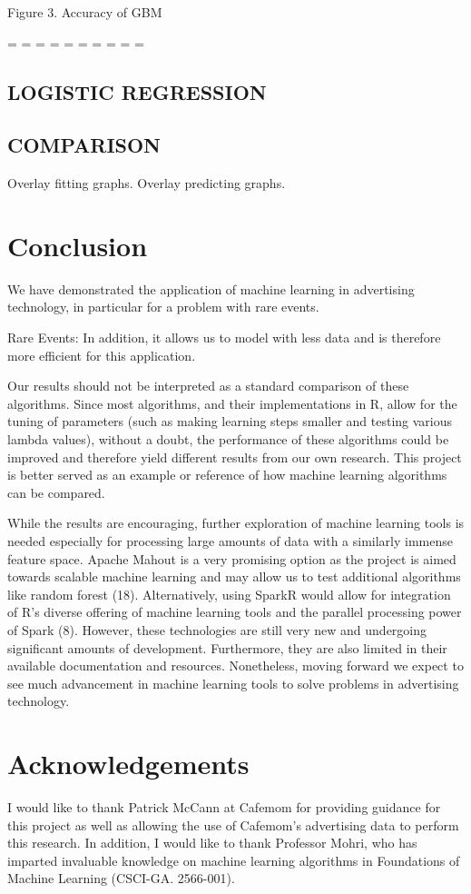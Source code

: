\documentclass[a4paper]{article}
\begin{document}
\begin{multicols}{2}
\begin{center}
Figure 3. Accuracy of GBM
\end{center}

=
=
=
=
=
=
=
=
=
=
\subsection*{LOGISTIC REGRESSION}

\subsection*{COMPARISON}
Overlay fitting graphs.
Overlay predicting graphs.





\section*{Conclusion}
We have demonstrated the application of machine learning in advertising technology, in particular for a problem with rare events. 


Rare Events: In addition, it allows us to model with less data and is therefore more efficient for this application.


Our results should not be interpreted as a standard comparison of these algorithms. Since most algorithms, and their implementations in R, allow for the tuning of parameters (such as making learning steps smaller and testing various lambda values), without a doubt, the performance of these algorithms could be improved and therefore yield different results from our own research. This project is better served as an example or reference of how machine learning algorithms can be compared.

While the results are encouraging, further exploration of machine learning tools is needed especially for processing large amounts of data with a similarly immense feature space. Apache Mahout is a very promising option as the project is aimed towards scalable machine learning and may allow us to test additional algorithms like random forest (18). Alternatively, using SparkR would allow for integration of R's diverse offering of machine learning tools and the parallel processing power of Spark (8). However, these technologies are still very new and undergoing significant amounts of development. Furthermore, they are also limited in their available documentation and resources. Nonetheless, moving forward we expect to see much advancement in machine learning tools to solve problems in advertising technology.

\section*{Acknowledgements}
I would like to thank Patrick McCann at Cafemom for providing guidance for this project as well as allowing the use of Cafemom's advertising data to perform this research. In addition, I would like to thank Professor Mohri, who has imparted invaluable knowledge on machine learning algorithms in Foundations of Machine Learning (CSCI-GA. 2566-001).

\end{multicols}
\end{document}
